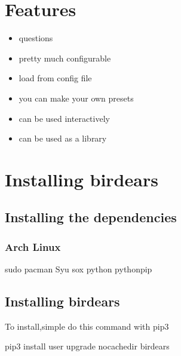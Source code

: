 \documentclass[letterpaper,10pt,english]{sphinxmanual}
\begin{document}
\chapter{Features}
\label{\detokenize{index:features}}\begin{itemize}
\item {} 
questions

\item {} 
pretty much configurable

\item {} 
load from config file

\item {} 
you can make your own presets

\item {} 
can be used interactively 

\item {} 
can be used as a library 

\end{itemize}


\chapter{Installing birdears}
\label{\detokenize{index:installing-birdears}}

\section{Installing the dependencies}
\label{\detokenize{index:installing-the-dependencies}}

\subsection{Arch Linux}
\label{\detokenize{index:arch-linux}}
%
\begin{sphinxVerbatim}[commandchars=\\\{\}]
sudo pacman \PYGZhy{}Syu sox python python\PYGZhy{}pip
\end{sphinxVerbatim}


\section{Installing birdears}
\label{\detokenize{index:id1}}
To install,simple do this command with pip3

%
\begin{sphinxVerbatim}[commandchars=\\\{\}]
pip3 install \PYGZhy{}\PYGZhy{}user \PYGZhy{}\PYGZhy{}upgrade \PYGZhy{}\PYGZhy{}no\PYGZhy{}cache\PYGZhy{}dir birdears
\end{sphinxVerbatim}
\end{document}
